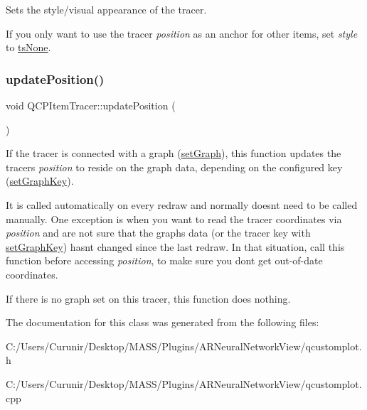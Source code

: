 Sets the style/visual appearance of the tracer.

If you only want to use the tracer {\itshape position} as an anchor for other items, set {\itshape style} to \hyperlink{class_q_c_p_item_tracer_a2f05ddb13978036f902ca3ab47076500af543193a0b17ac133beb26152292f6b6}{ts\+None}. \mbox{\label{class_q_c_p_item_tracer_a5b90296109e36384aedbc8908a670413}} 
\subsubsection{\texorpdfstring{update\+Position()}{updatePosition()}}
{\footnotesize\ttfamily void Q\+C\+P\+Item\+Tracer\+::update\+Position (\begin{DoxyParamCaption}{ }\end{DoxyParamCaption})}

If the tracer is connected with a graph (\hyperlink{class_q_c_p_item_tracer_af5886f4ded8dd68cb4f3388f390790c0}{set\+Graph}), this function updates the tracer\textquotesingle{}s {\itshape position} to reside on the graph data, depending on the configured key (\hyperlink{class_q_c_p_item_tracer_a6840143b42f3b685cedf7c6d83a704c8}{set\+Graph\+Key}).

It is called automatically on every redraw and normally doesn\textquotesingle{}t need to be called manually. One exception is when you want to read the tracer coordinates via {\itshape position} and are not sure that the graph\textquotesingle{}s data (or the tracer key with \hyperlink{class_q_c_p_item_tracer_a6840143b42f3b685cedf7c6d83a704c8}{set\+Graph\+Key}) hasn\textquotesingle{}t changed since the last redraw. In that situation, call this function before accessing {\itshape position}, to make sure you don\textquotesingle{}t get out-\/of-\/date coordinates.

If there is no graph set on this tracer, this function does nothing. 

The documentation for this class was generated from the following files\+:\begin{DoxyCompactItemize}
\item 
C\+:/\+Users/\+Curunir/\+Desktop/\+M\+A\+S\+S/\+Plugins/\+A\+R\+Neural\+Network\+View/qcustomplot.\+h\item 
C\+:/\+Users/\+Curunir/\+Desktop/\+M\+A\+S\+S/\+Plugins/\+A\+R\+Neural\+Network\+View/qcustomplot.\+cpp\end{DoxyCompactItemize}

